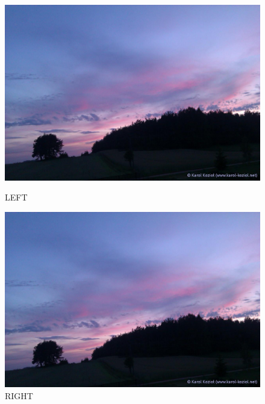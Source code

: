 \documentclass[12pt]{article}
\begin{document}
\begin{figure}[htbp]
    \centering
    \begin{minipage}[t]{0.48\textwidth}
        \centering
        \includegraphics[width=\textwidth]{sky.jpg}
        \caption{LEFT}
    \end{minipage}
    \begin{minipage}[t]{0.48\textwidth}
        \centering
        \includegraphics[width=\textwidth]{sky.jpg}
        \caption{RIGHT}
    \end{minipage}
\end{figure}
\end{document}
